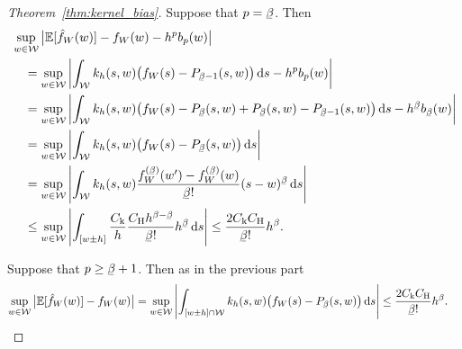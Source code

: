 \begin{proof}[Theorem~\ref{thm:kernel_bias}]
  Suppose that $p = \flbeta$.
  Then
  \begin{align*}
    &\sup_{w \in \cW}
    \big|
    \E[\hat f_W(w)]
    - f_W(w)
    - h^p b_p(w)
    \big| \\
    &\quad=
    \sup_{w \in \cW}
    \left|
    \int_{\cW}
    k_h(s,w)
    \big(f_W(s) - P_{\flbeta - 1}(s,w)\big)
    \diff{s}
    - h^p b_p(w)
    \right| \\
    &\quad=
    \sup_{w \in \cW}
    \left|
    \int_{\cW}
    k_h(s,w)
    \big(
      f_W(s) - P_{\flbeta}(s,w)
      + P_{\flbeta}(s,w) - P_{\flbeta - 1}(s,w)
    \big)
    \diff{s}
    - h^{\flbeta} b_{\flbeta}(w)
    \right| \\
    &\quad=
    \sup_{w \in \cW}
    \left|
    \int_{\cW}
    k_h(s,w)
    \big(
      f_W(s) - P_{\flbeta}(s,w)
    \big)
    \diff{s}
    \right| \\
    &\quad=
    \sup_{w \in \cW}
    \left|
    \int_{\cW}
    k_h(s,w)
    \frac{f_W^{(\flbeta)}(w') - f_W^{(\flbeta)}(w)}{\flbeta!}
    (s-w)^{\flbeta}
    \diff{s}
    \right| \\
    &\quad\leq
    \sup_{w \in \cW}
    \left|
    \int_{[w \pm h]}
    \frac{C_\rk}{h}
    \frac{C_\rH h^{\beta - \flbeta}}{\flbeta !}
    h^{\flbeta}
    \diff{s}
    \right|
    \leq
    \frac{2 C_\rk C_\rH}{\flbeta !}
    h^\beta.
  \end{align*}

  Suppose that $p \geq \flbeta+1$.
  Then as in the previous part
  \begin{align*}
    \sup_{w \in \cW}
    \big|
    \E[\hat f_W(w)]
    - f_W(w)
    \big|
    &=
    \sup_{w \in \cW}
    \left|
    \int_{[w \pm h] \cap \cW}
    k_h(s,w)
    \big(
      f_W(s) - P_{\flbeta}(s,w)
    \big)
    \diff{s}
    \right|
    \leq
    \frac{2 C_\rk C_\rH}{\flbeta !}
    h^\beta.
  \end{align*}
\end{proof}

